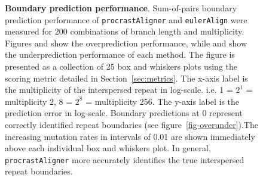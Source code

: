 \documentclass{llncs}
\begin{document}
\begin{figure}[t!]
\centering
{}
\caption{\textbf{Boundary prediction performance}. Sum-of-pairs boundary prediction performance of \texttt{procrastAligner} and \texttt{eulerAlign} were measured for 200 combinations of branch length and multiplicity. Figures  and  show the overprediction performance, while  and  show the underprediction performance of each method. The figure is presented as a collection of 25 box and whiskers plots using the scoring metric detailed in Section~\ref{sec:metrics}. The x-axis label is the multiplicity of the interspersed repeat in log-scale. i.e. 1 = $2^{1}$ = multiplicity 2, 8 = $2^{8}$ = multiplicity 256. The y-axis label is the prediction error in log-scale. Boundary predictions at 0 represent correctly identified repeat boundaries (see figure~\ref{fig-overunder}).The increasing mutation rates in intervals of 0.01 are shown immediately above each individual box and whiskers plot. In general, \texttt{procrastAligner} more accurately identifies the true interspersed repeat boundaries.}
\label{fig-boundary}
\end{figure}
\end{document}
